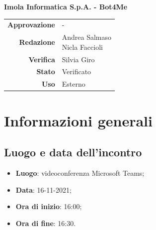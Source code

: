 \documentclass[11pt]{article}
\begin{document}
\begin{titlepage}
\begin{center}
			\large
			\textbf{Imola Informatica S.p.A. - Bot4Me}\\
			
			\vfill
			
			\begin{tabular}{r|l}
				\textbf{Approvazione} &  -\\
				\textbf{Redazione} &  \parbox[t]{3.5cm}{Andrea Salmaso \\Nicla Faccioli}\\
				\textbf{Verifica} &  Silvia Giro\\
				\textbf{Stato} & Verificato \\
				\textbf{Uso} & Esterno
			\end{tabular}
			\vfill
			
		\end{center}
	\end{titlepage}

	\newpage

	\section{Informazioni generali}
	\subsection{Luogo e data dell'incontro}
	\begin{itemize}
		\item \textbf{Luogo}: videoconferenza Microsoft Teams;
		\item \textbf{Data}: 16-11-2021;
		\item \textbf{Ora di inizio}: 16:00;
		\item \textbf{Ora di fine}: 16:30.
	\end{itemize}
	
\end{document}
